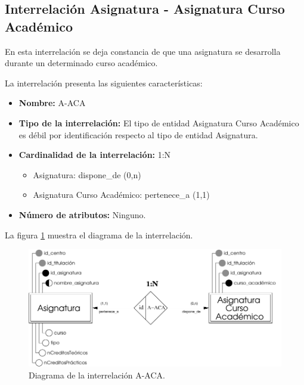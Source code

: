 \subsection{Interrelación Asignatura - Asignatura Curso Académico}

   \begin{description}
      \item[Definición] En esta interrelación se deja constancia de que una
      asignatura se desarrolla durante un determinado curso académico.

      \item[Características] La interrelación presenta las siguientes
                             características:

         \begin{itemize}
            \item \textbf{Nombre:} A-ACA
            \item \textbf{Tipo de la interrelación:} El tipo de entidad
                  Asignatura Curso Académico es débil por identificación
                  respecto al tipo de entidad Asignatura.
            \item \textbf{Cardinalidad de la interrelación:} 1:N
                  \begin{itemize}
                     \item Asignatura: dispone\_de (0,n)
                     \item Asignatura Curso Académico: pertenece\_a (1,1)
                  \end{itemize}
            \item \textbf{Número de atributos:} Ninguno.
         \end{itemize}

      \item[Diagrama] La figura \ref{diagramaA-ACA} muestra el diagrama de la
                      interrelación.

      \item \begin{figure}[!ht]
            \begin{center}
            \includegraphics[]{07.Modelo_Entidad-Interrelacion/7.3.Analisis_Interrelaciones/diagramas/A-ACA.pdf}
            \caption{Diagrama de la interrelación A-ACA.}
            \label{diagramaA-ACA}
            \end{center}
         \end{figure}


\end{description}
